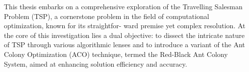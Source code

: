 
%
This thesis embarks on a comprehensive exploration of the Travelling Salesman Problem (TSP), a cornerstone problem in the field of computational optimization, known for its straightfor- ward premise yet complex resolution. At the core of this investigation lies a dual objective: to dissect the intricate nature of TSP through various algorithmic lenses and to introduce a variant of the Ant Colony Optimization (ACO) technique, termed the Red-Black Ant Colony System, aimed at enhancing solution efficiency and accuracy.

